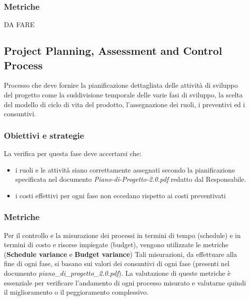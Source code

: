 \documentclass[a4paper,11pt]{article}
\begin{document}
\begin{itemize}
\subsubsection{Metriche}
DA FARE

\subsection{Project Planning, Assessment and Control Process}
Processo che deve fornire la pianificazione dettagliata delle attività di sviluppo del progetto come la suddivisione temporale delle varie fasi di sviluppo, la scelta del modello di ciclo di vita del prodotto, l'assegnazione dei ruoli, i preventivi ed i consuntivi.

\subsubsection{Obiettivi e strategie}
La verifica per questa fase deve accertarsi che:
\begin{itemize}
\item i ruoli e le attività siano correttamente assegnati secondo la pianificazione specificata nel documento \textit{Piano-di-Progetto-2.0.pdf} redatto dal Responsabile.
\item i costi effettivi per ogni fase non eccedano rispetto ai costi preventivati
\end{itemize}
\subsubsection{Metriche}
Per il controllo e la misurazione dei processi in termini di tempo (schedule) e in termini di costo e risorse impiegate (budget), vengono utilizzate le metriche (\textbf{Schedule variance} e \textbf{Budget variance}) 
Tali misurazioni, da effettuare alla fine di ogni fase, si basano sui valori dei consuntivi di ogni fase (presenti nel documento \textit{piano\_di\_progetto\_2.0.pdf}). La valutazione di queste metriche è essenziale per verificare l'andamento di ogni processo misurato e valutarne quindi il miglioramento o il peggioramento complessivo.


\end{itemize}
\end{document}
